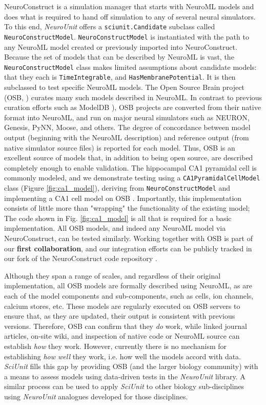 \documentclass[11pt,letterpaper]{article}
\begin{document}
NeuroConstruct \cite{neuroconstruct_url,gleeson_neuroconstruct:_2007} is a simulation manager that starts with NeuroML models and does what is required to hand off simulation to any of several neural simulators. To this end, \textit{NeuroUnit} offers a \verb|sciunit.Candidate| subclass called \verb|NeuroConstructModel|. \verb|NeuroConstructModel| is instantiated with the path to any NeuroML model created or previously imported into NeuroConstruct.  Because the set of models that can be described by NeuroML is vast, the \verb|NeuroConstructModel| class makes limited assumptions about candidate models: that they each is \verb|TimeIntegrable|, and \verb|HasMembranePotential|.  It is then subclassed to test specific NeuroML models. 
The Open Source Brain project (OSB, \cite{osb_url}) curates many such models described in NeuroML. In contrast to previous curation efforts such as ModelDB \cite{modeldb_url,hines_modeldb:_2004}), OSB projects are converted from their native format into NeuroML, and run on major neural simulators such as NEURON, Genesis, PyNN, Moose, and others. The degree of concordance between model output (beginning with the NeuroML description) and reference output (from native simulator source files) is reported for each model.  Thus, OSB is an excellent source of models that, in addition to being open source, are described completely enough to enable validation.   The hippocampal CA1 pyramidal cell is commonly modeled, and we demonstrate testing using a \verb|CA1PyramidalCellModel| class (Figure \ref{fig:ca1_model}), deriving from \verb|NeuroConstructModel| and implementing a CA1 cell model on OSB \cite{osb_ca1_url}.  Importantly, this implementation consists of little more than "wrapping" the functionality of the existing model; The code shown in Fig. \ref{fig:ca1_model} is all that is required for a basic implementation.  All OSB models, and indeed any NeuroML model via NeuroConstruct, can be tested similarly.  Working together with OSB is part of our \textbf{first collaboration}, and our integration efforts can be publicly tracked in our fork of the NeuroConstruct code repository \cite{neuroconstruct_rgerkin_url}.  

Although they span a range of scales, and regardless of their original implementation, all OSB models are formally described using NeuroML, as are each of the model components and sub-components, such as cells, ion channels, calcium stores, etc.  These models are regularly executed on OSB servers to ensure that, as they are updated, their output is consistent with previous versions.  Therefore, OSB can confirm that they \textit{do} work, while linked journal articles, on-site wiki, and inspection of native code or NeuroML source can establish \textit{how} they work. However, currently there is no mechanism for establishing \textit{how well} they work, i.e. how well the models accord with data.  \textit{SciUnit} fills this gap by providing OSB (and the larger biology community) with a means to assess models using data-driven tests in the \textit{NeuroUnit} library.  A similar process can be used to apply \textit{SciUnit} to other biology sub-disciplines using \textit{NeuroUnit} analogues developed for those disciplines.
\end{document}
